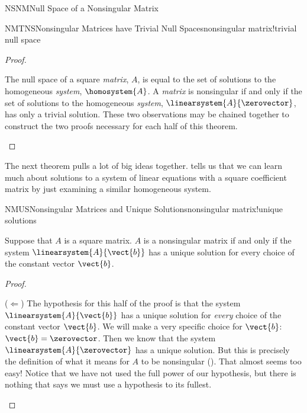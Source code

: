 \begin{subsect}{NSNM}{Null Space of a Nonsingular Matrix}
\begin{theorem}{NMTNS}{Nonsingular Matrices have Trivial Null Spaces}{nonsingular matrix!trivial null space}
\end{theorem}
%
\begin{proof}
\begin{para}The null space of a square {\em matrix}, $A$, is equal to the set of solutions to the homogeneous {\em system}, $\homosystem{A}$.  A {\em matrix} is nonsingular if and only if the set of solutions to the homogeneous {\em system}, $\linearsystem{A}{\zerovector}$, has only a trivial solution.  These two observations may be chained together to construct the two proofs necessary for each half of this theorem.\end{para}
\end{proof}
%
\begin{para}The next theorem pulls a lot of big ideas together.
 tells us that we can learn much about solutions to a system of linear equations with a square coefficient matrix by just examining a similar homogeneous system.\end{para}
%
\begin{theorem}{NMUS}{Nonsingular Matrices and Unique Solutions}{nonsingular matrix!unique solutions}
\begin{para}Suppose that $A$ is a square matrix.  $A$ is a nonsingular matrix if and only if the system $\linearsystem{A}{\vect{b}}$ has a unique solution for every choice of the constant vector $\vect{b}$.\end{para}
\end{theorem}
%
\begin{proof}
\begin{para}($\Leftarrow$)  The hypothesis for this half of the proof is that the system $\linearsystem{A}{\vect{b}}$ has a unique solution for {\em every} choice of the constant vector $\vect{b}$.  We will make a very specific choice for $\vect{b}$:  $\vect{b}=\zerovector$.  Then we know that the system $\linearsystem{A}{\zerovector}$ has a unique solution.  But this is precisely the definition of what it means for $A$ to be nonsingular ().  That almost seems too easy!  Notice that we have not used the full power of our hypothesis, but there is nothing that says we must use a hypothesis to its fullest.\end{para}
%

\end{proof}
\end{subsect}
